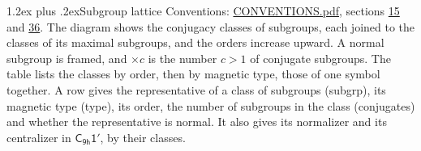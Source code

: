 \documentclass[10pt,a4paper]{article}
\makeatletter
\renewcommand\section{\@startsection{section}{1}{\z@}{-3ex plus -1ex minus -.2ex}%
  {1.2ex plus .2ex}{\normalfont\large\sffamily\bfseries\color{parttitle}}}
\numberwithin{equation}{section}
\newcommand{\grp}[1]{\mathsf{#1}}
\makeatother
\begin{document}
\section{Subgroup lattice}\label{s:subgroups}
Conventions: \href{../../CONVENTIONS.pdf}{CONVENTIONS.pdf}, sections \href{../../../rotation/CONVENTIONS.pdf\#conv.15}{15} and \href{../../CONVENTIONS.pdf\#conv.36}{36}.
The diagram shows the conjugacy classes of subgroups, each joined to the classes of its maximal subgroups, and the orders increase upward. \label{n:index.conjugates.c}A normal subgroup is framed, and ${\times}c$ is the number $c > 1$ of conjugate subgroups. The table lists the classes by order, then by magnetic type, those of one symbol together. \label{n:head.subgroup}\label{n:head.magnetic.type}\label{n:head.order}\label{n:head.conjugates}\label{n:head.normal}A row gives the representative of a class of subgroups (subgrp), its magnetic type (type), its order, the number of subgroups in the class (conjugates) and whether the representative is normal. \label{n:head.normalizer}\label{n:head.centralizer}It also gives its normalizer and its centralizer in $\grp{C_{9h}1'}$, by their classes. 
\end{document}
